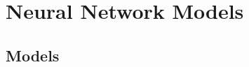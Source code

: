 \footnotesize
\renewcommand{\thechapter}{\Roman{chapter}}

\renewcommand{\thesection}{\Alph{section}.}

\chapter{Neural Network Models}
\label{append:two}

\section{Models}


